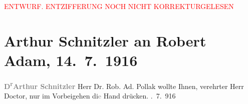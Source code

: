 
\begin{center}
            \textcolor{red}{ENTWURF. ENTZIFFERUNG NOCH NICHT KORREKTURGELESEN}
                      \end{center}
            
               \section[Arthur Schnitzler an Robert Adam, 14. 7. 1916]{ Arthur Schnitzler an Robert Adam, 14. 7. 1916}\nopagebreak{}\rehead{ }\begin{ledgroupsized}[t]{13cm}\normalsize\beginnumbering{} \toendnotes[C]{\smallbreak\pagebreak[2]} 
\pstart
           \noindent{}\centering{}{\pb}\textcolor{gray}{\textbf{D\textsuperscript{r}Arthur Schnitzler}}\pend
           \pstart
           \noindent{}Herr Dr. Rob. Ad. Pollak\pend
           \pstart
           {\pb}wollte Ihnen, verehrter Herr Doctor, nur im
                    Vorbeigehen di\textcolor{gray}{e} Hand drücken.\pend
           . 7. 916\pend
           \endnumbering{}\end{ledgroupsized}  \newcommand{\dateiname}{L02231}\newcommand{\titel}{Arthur Schnitzler an Robert Adam, 14. 7. 1916}\newcommand{\editorInnen}{Martin Anton Müller und Gerd-Hermann Susen}
      
